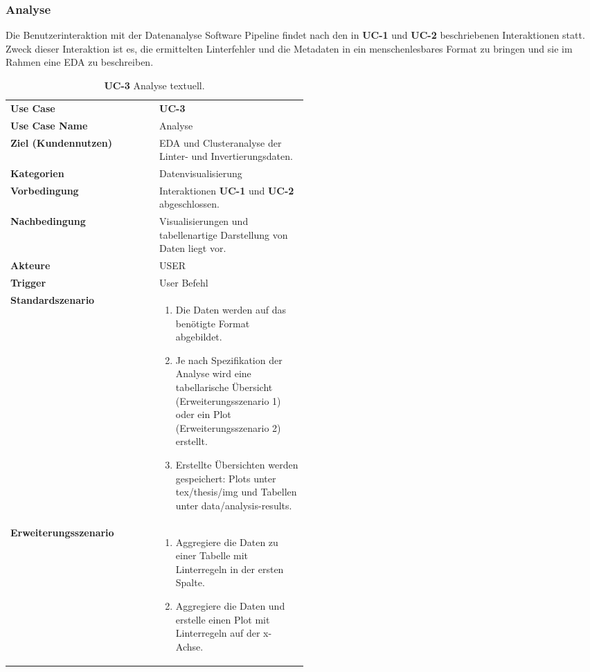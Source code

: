 \subsubsection{Analyse} \label{sec:analyse}
Die Benutzerinteraktion mit der Datenanalyse Software Pipeline findet nach den in \textbf{UC-1} und \textbf{UC-2} beschriebenen Interaktionen statt. Zweck dieser Interaktion ist es, die ermittelten Linterfehler und die Metadaten in ein menschenlesbares Format zu bringen und sie im Rahmen eine \acf{EDA} zu beschreiben. 

\begin{longtable}{lp{0.5\linewidth}}
  \caption{\textbf{UC-3} Analyse textuell.}
  \endfirsthead
  \endhead
  \hline\hline
  \textbf{Use Case} & \textbf{UC-3} \\ 
  \textbf{Use Case Name} & Analyse \\
  \textbf{Ziel (Kundennutzen)} & \acs{EDA} und Clusteranalyse der Linter- und Invertierungsdaten. \\
  \textbf{Kategorien} & Datenvisualisierung \\
  \textbf{Vorbedingung} & Interaktionen \textbf{UC-1} und \textbf{UC-2} abgeschlossen. \\
  \textbf{Nachbedingung} & Visualisierungen und tabellenartige Darstellung von Daten liegt vor. \\
  \textbf{Akteure} & USER \\
  \textbf{Trigger} & User Befehl \\
  \textbf{Standardszenario} & 
  \vspace{-0.7cm}
  \begin{enumerate}
    \item Die Daten werden auf das benötigte Format abgebildet.
    \item Je nach Spezifikation der Analyse wird eine tabellarische Übersicht (Erweiterungsszenario 1) oder ein Plot (Erweiterungsszenario 2) erstellt.
    \item Erstellte Übersichten werden gespeichert: Plots unter tex/thesis/img und Tabellen unter data/analysis-results.
  \end{enumerate}
  \\
  \textbf{Erweiterungsszenario} & 
  \vspace{-0.7cm}
  \begin{enumerate}
    \item Aggregiere die Daten zu einer Tabelle mit Linterregeln in der ersten Spalte.
    \item Aggregiere die Daten und erstelle einen Plot mit Linterregeln auf der x-Achse.

\end{enumerate}
\end{longtable}
